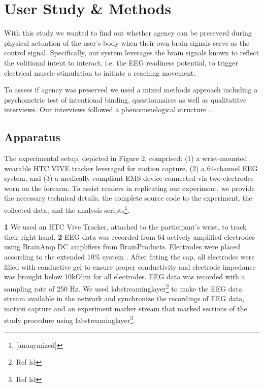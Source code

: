 

\section{User Study \& Methods}

With this study we wanted to find out whether agency can be preseverd during physical actuation of the user's body when their own brain signals serve as the control signal. Specifically, our system leverages the brain signals known to reflect the volitional intent to interact, i.e. the EEG readiness potential, to trigger electrical muscle stimulation to initiate a reaching movement.

To assess if agency was preserved we used a mixed methods approach including a psychometric test of intentional binding, questionnaires as well as qualitatitve interviews. Our interviews followed a phenomenelogical structure .

\subsection{Apparatus}
The experimental setup, depicted in Figure 2, comprised: (1) a wrist-mounted wearable HTC VIVE tracker leveraged for motion capture, (2) a 64-channel EEG system, and (3) a medically-compliant EMS device connected via two electrodes worn on the forearm. To assist readers in replicating our experiment, we provide the necessary technical details, the complete source code to the experiment, the collected data, and the analysis scripts\footnote{[anonymized]}.

\indent\textbf{1} We used an HTC Vive Tracker, attached to the participant's wrist, to track their right hand.
\indent\textbf{2} EEG data was recorded from 64 actively amplified electrodes using BrainAmp DC amplifiers from BrainProducts. Electrodes were placed according to the extended 10\% system . After fitting the cap, all electrodes were filled with conductive gel to ensure proper conductivity and electrode impedance was brought below 10kOhm for all electrodes. EEG data was recorded with a sampling rate of 250 Hz. We used labstreaminglayer\footnote{Ref lsl} to make the EEG data stream available in the network and synchronize the recordings of EEG data, motion capture and an experiment marker stream that marked sections of the study procedure using labstreaminglayer\footnote{Ref lsl}.


